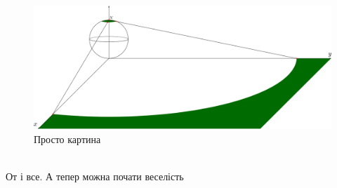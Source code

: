 \documentclass[a4paper, 14pt]{extarticle}
\begin{document}
\begin{figure}[h]
\centerline{\includegraphics[scale = 0.5]{Riemann_sphereINF.png}}
\caption{Просто картина}
\end{figure}
\\
От і все. А тепер можна почати веселість\\
\end{document}
